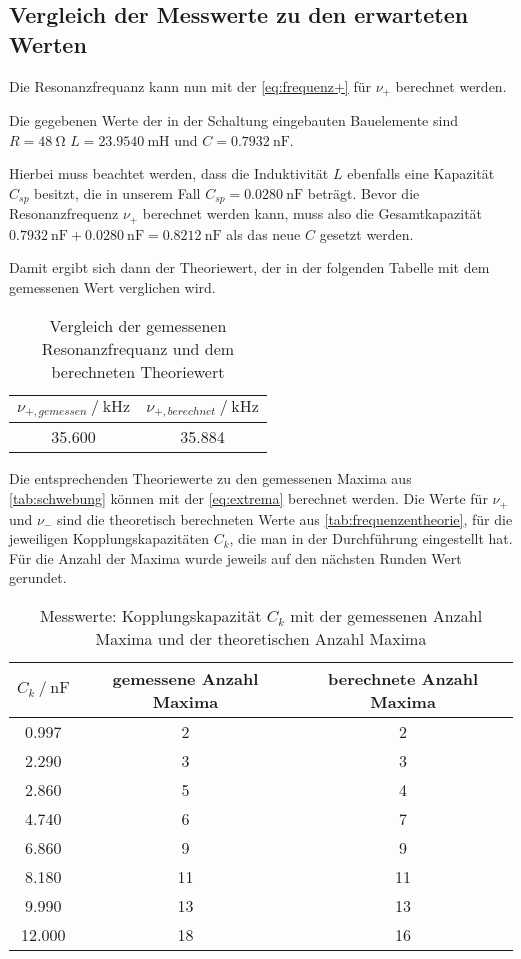 \subsection{Vergleich der Messwerte zu den erwarteten Werten}

Die Resonanzfrequanz kann nun mit der \autoref{eq:frequenz+} für $\nu _+$ berechnet werden.

Die gegebenen Werte der in der Schaltung eingebauten Bauelemente sind $R = \SI{48}{\ohm}$ $L = \SI{23.9540}{\milli\henry}$ und $C = \SI{0.7932}{\nano\farad}$.

Hierbei muss beachtet werden, dass die Induktivität $L$ ebenfalls eine Kapazität $C_{sp}$ besitzt, die in unserem Fall $C_{sp} = \SI{0.0280}{\nano\farad}$ beträgt.
Bevor die Resonanzfrequenz $\nu _+$ berechnet werden kann, muss also die Gesamtkapazität $\SI{0.7932}{\nano\farad} + \SI{0.0280}{\nano\farad} = \SI{0.8212}{\nano\farad}$ als das neue $C$ gesetzt werden.

Damit ergibt sich dann der Theoriewert, der in der folgenden Tabelle mit dem gemessenen Wert verglichen wird.

\begin{table}
  \centering
  \caption{Vergleich der gemessenen Resonanzfrequanz und dem berechneten Theoriewert}
  \label{tab:resonanz}
  \begin{tabular}{c c}
    \toprule 
    $\nu _{+,gemessen} \:/\: \si{\kilo\hertz}$ & $\nu _{+,berechnet} \:/\: \si{\kilo\hertz}$    \\ 
    \midrule 
    35.600 & 35.884 \\
    \bottomrule
  \end{tabular}
\end{table}

Die entsprechenden Theoriewerte zu den gemessenen Maxima aus \autoref{tab:schwebung} können mit der \autoref{eq:extrema} berechnet werden. Die Werte für $\nu _+$ und $\nu _-$ sind die theoretisch berechneten Werte aus \autoref{tab:frequenzentheorie}, für die jeweiligen Kopplungskapazitäten $C_k$, die man in der Durchführung eingestellt hat. Für die Anzahl der Maxima wurde jeweils auf den nächsten Runden Wert gerundet.

\begin{table}
  \centering
  \caption{Messwerte: Kopplungskapazität $C_k $ mit der gemessenen Anzahl Maxima und der theoretischen Anzahl Maxima }
  \label{tab:schwebungstheorie}
  \begin{tabular}{c c c}
    \toprule 
    $C_k \:/\: \si{\nano\farad}$ & gemessene Anzahl Maxima &  berechnete Anzahl Maxima   \\ 
    \midrule 
    0.997 & 2 & 2 \\
    2.290 & 3 & 3 \\
    2.860 & 5 & 4 \\
    4.740 & 6 & 7 \\
    6.860 & 9 & 9 \\
    8.180 & 11 & 11 \\
    9.990 & 13 & 13 \\
    12.000 & 18 & 16 \\
    \bottomrule
  \end{tabular}
\end{table}

